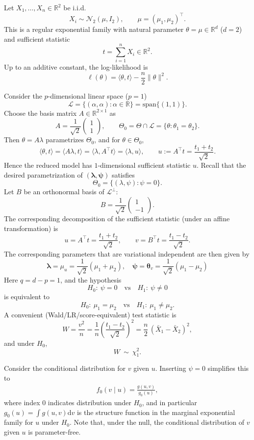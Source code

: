 \begin{eg}
    Let $X_1,\dots,X_n\in\mathbb{R}^2$ be i.i.d.
\[
X_i \sim \mathcal{N}_2(\mu, I_2),\qquad \mu=(\mu_1,\mu_2)^\top .
\]
This is a regular exponential family with natural parameter $\theta=\mu\in\mathbb{R}^d$ ($d=2$) and sufficient statistic
\[
t=\sum_{i=1}^n X_i\in\mathbb{R}^2.
\]
Up to an additive constant, the log-likelihood is
\[
\ell(\theta)=\langle \theta,t\rangle-\frac{n}{2}\|\theta\|^2.
\]

Consider the $p$-dimensional linear space ($p=1$)
\[
\mathcal{L}=\{(\alpha,\alpha):\alpha\in\mathbb{R}\}=\mathrm{span}\{(1,1)\}.
\]
Choose the basis matrix $A\in\mathbb{R}^{2\times 1}$ as
\[
A=\frac{1}{\sqrt{2}}
\begin{pmatrix}
1\\[2pt]
1
\end{pmatrix},
\qquad
\Theta_0=\Theta\cap \mathcal{L}=\{\theta:\theta_1=\theta_2\}.
\]
Then $\theta=A\lambda$ parametrizes $\Theta_0$, and for $\theta\in\Theta_0$,
\[
\langle \theta,t\rangle=\langle A\lambda,t\rangle=\langle \lambda, A^\top t\rangle
=\langle \lambda,u\rangle,
\qquad
u:=A^\top t=\frac{t_1+t_2}{\sqrt{2}}.
\]
Hence the reduced model has $1$-dimensional sufficient statistic $u$. Recall that the desired parametrization of $(\boldsymbol{\lambda},\boldsymbol{\psi})$ satisfies
\[
\Theta_0=\{(\lambda,\psi):\psi=0\}.
\]
Let $B$ be an orthonormal basis of $\mathcal{L}^\perp$:
\[
B=\frac{1}{\sqrt{2}}
\begin{pmatrix}
1\\[2pt]
-1
\end{pmatrix}.
\]
The corresponding decomposition of the sufficient statistic (under an affine transformation) is
\[
u=A^\top t=\frac{t_1+t_2}{\sqrt{2}},\qquad
v=B^\top t=\frac{t_1-t_2}{\sqrt{2}}.
\]
The corresponding parameters that are variational independent are then given by
\[
\boldsymbol\lambda=\mu_u=\frac{1}{\sqrt{2}}(\mu_1+\mu_2),\quad  \boldsymbol{\psi}=\boldsymbol{\theta}_v=\frac{1}{\sqrt{2}}(\mu_1-\mu_2)
\]
Here $q=d-p=1$, and the hypothesis
\[
H_0:\ \psi=0
\quad \text{vs}\quad
H_1:\ \psi\neq 0
\]
is equivalent to
\[
H_0:\ \mu_1=\mu_2
\quad \text{vs}\quad
H_1:\ \mu_1\neq \mu_2.
\]
A convenient (Wald/LR/score-equivalent) test statistic is
\[
W=\frac{v^2}{n}
=\frac{1}{n}\left(\frac{t_1-t_2}{\sqrt{2}}\right)^2
=\frac{n}{2}\,(\bar X_1-\bar X_2)^2,
\]
and under $H_0$,
\[
W\ \sim\ \chi^2_{1}.
\]
\end{eg}




Consider the conditional distribution for $v$ given $u$. Inserting $\psi=0$ simplifies this to
\begin{align*}
f_0(v \mid u)=\frac{g(u, v)}{g_0(u)},
\end{align*}
where index 0 indicates distribution under $H_0$, and in particular $g_0(u)=\int g(u, v) \mathrm{d} v$ is the structure function in the marginal exponential family for $u$ under $H_0$. Note that, under the null, the conditional distribution of $v$ given $u$ is parameter-free.

